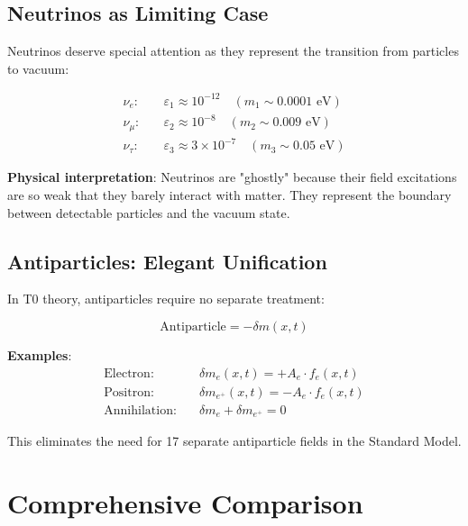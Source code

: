 \documentclass[12pt,a4paper]{article}
\newcommand{\deltam}{\delta m}
\begin{document}
	\subsection{Neutrinos as Limiting Case}
	
	Neutrinos deserve special attention as they represent the transition from particles to vacuum:
	
	\begin{equation}
		\begin{aligned}
			\nu_e: \quad &\varepsilon_1 \approx 10^{-12} \quad (m_1 \sim 0.0001 \text{ eV}) \\
			\nu_\mu: \quad &\varepsilon_2 \approx 10^{-8} \quad (m_2 \sim 0.009 \text{ eV}) \\
			\nu_\tau: \quad &\varepsilon_3 \approx 3 \times 10^{-7} \quad (m_3 \sim 0.05 \text{ eV})
		\end{aligned}
		\label{eq:neutrino_spectrum}
	\end{equation}
	
	\textbf{Physical interpretation}: Neutrinos are "ghostly" because their field excitations are so weak that they barely interact with matter. They represent the boundary between detectable particles and the vacuum state.
	
	\subsection{Antiparticles: Elegant Unification}
	
	In T0 theory, antiparticles require no separate treatment:
	
	\begin{equation}
		\boxed{\text{Antiparticle} = -\deltam(x,t)}
		\label{eq:antiparticle_unification}
	\end{equation}
	
	\textbf{Examples}:
	\begin{align}
		\text{Electron}: \quad &\deltam_e(x,t) = +A_e \cdot f_e(x,t) \\
		\text{Positron}: \quad &\deltam_{e^+}(x,t) = -A_e \cdot f_e(x,t) \\
		\text{Annihilation}: \quad &\deltam_e + \deltam_{e^+} = 0
	\end{align}
	
	This eliminates the need for 17 separate antiparticle fields in the Standard Model.
	
	\section{Comprehensive Comparison}
	
\end{document}

